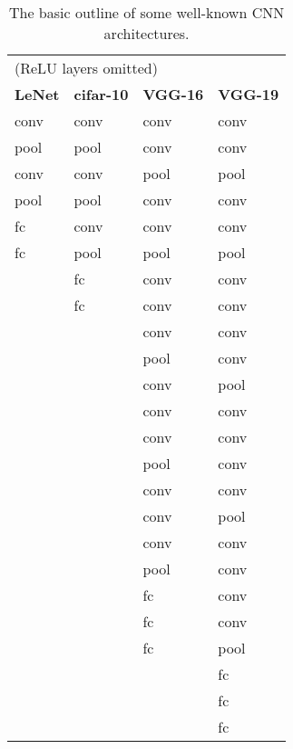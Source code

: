 \begin{table}[]
\centering
\caption[Some well-known CNN architectures]{The basic outline of some well-known CNN architectures.}
\label{tbl:cnns}
\begin{tabular}{llll}
\multicolumn{4}{l}{(ReLU layers omitted)}                              \\
\textbf{LeNet} & \textbf{cifar-10} & \textbf{VGG-16} & \textbf{VGG-19} \\
conv           & conv              & conv            & conv            \\
pool           & pool              & conv            & conv            \\
conv           & conv              & pool            & pool            \\
pool           & pool              & conv            & conv            \\
fc             & conv              & conv            & conv            \\
fc             & pool              & pool            & pool            \\
               & fc                & conv            & conv            \\
               & fc                & conv            & conv            \\
               &                   & conv            & conv            \\
               &                   & pool            & conv            \\
               &                   & conv            & pool            \\
               &                   & conv            & conv            \\
               &                   & conv            & conv            \\
               &                   & pool            & conv            \\
               &                   & conv            & conv            \\
               &                   & conv            & pool            \\
               &                   & conv            & conv            \\
               &                   & pool            & conv            \\
               &                   & fc              & conv            \\
               &                   & fc              & conv            \\
               &                   & fc              & pool            \\
               &                   &                 & fc              \\
               &                   &                 & fc              \\
               &                   &                 & fc             
\end{tabular}
\end{table}

